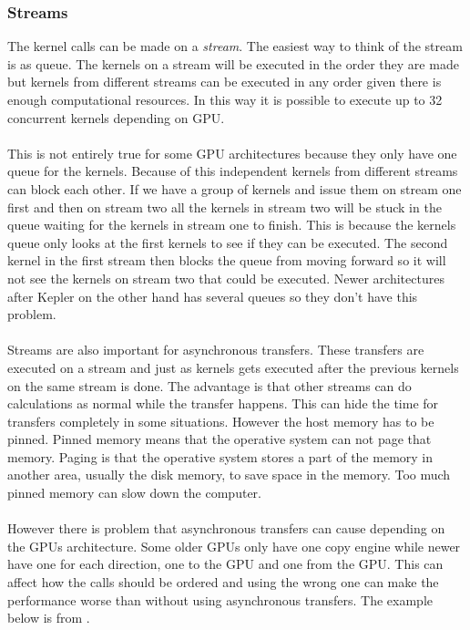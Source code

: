 \documentclass[10pt,a4paper]{report}
\begin{document}
\subsubsection{Streams}
\label{streams}
The kernel calls can be made on a \emph{stream}. The easiest way to think of the stream is as queue. The kernels on a stream will be executed in the order they are made but kernels from different streams can be executed in any order given there is enough computational resources. In this way it is possible to execute up to 32 concurrent kernels depending on GPU.\cite{cuda}\\
\\
This is not entirely true for some GPU architectures because they only have one queue for the kernels. Because of this independent kernels from different streams can block each other. If we have a group of kernels and issue them on stream one first and then on stream two all the kernels in stream two will be stuck in the queue waiting for the kernels in stream one to finish. This is because the kernels queue only looks at the first kernels to see if they can be executed. The second kernel in the first stream then blocks the queue from moving forward so it will not see the kernels on stream two that could be executed. Newer architectures after Kepler on the other hand has several queues so they don't have this problem.\cite{cuda, cuda_best_practice, kepler_tuning_guide}\\
\\
Streams are also important for asynchronous transfers. These transfers are executed on a stream and just as kernels gets executed after the previous kernels on the same stream is done. The advantage is that other streams can do calculations as normal while the transfer happens. This can hide the time for transfers completely in some situations. However the host memory has to be pinned. Pinned memory means that the operative system can not page that memory. Paging is that the operative system stores a part of the memory in another area, usually the disk memory, to save space in the memory. Too much pinned memory can slow down the computer.\cite{cuda, overlap_transfers_cuda}\\
\\
However there is problem that asynchronous transfers can cause depending on the GPUs architecture\cite{overlap_transfers_cuda, cuda_fortran_overlap}. Some older GPUs only have one copy engine while newer have one for each direction, one to the GPU and one from the GPU\cite{overlap_transfers_cuda, cuda_fortran_overlap}. This can affect how the calls should be ordered and using the wrong one can make the performance worse than without using asynchronous transfers\cite{overlap_transfers_cuda, cuda_fortran_overlap}. The example below is from \cite{cuda_fortran_overlap}.
\end{document}

